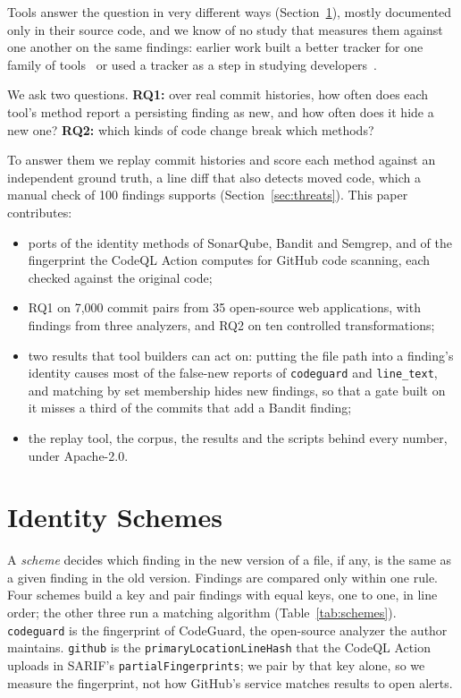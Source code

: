 \documentclass[conference]{IEEEtran}
\newif\ifanon
\begin{document}
Tools answer the question in very different ways (Section~\ref{sec:schemes}), mostly
documented only in their source code, and we know of no study that measures them against one
another on the same findings: earlier work built a better tracker for one family of
tools~\cite{li2022statictracker} or used a tracker as a step in studying
developers~\cite{avgustinov2015,kim2007}.

We ask two questions. \textbf{RQ1:} over real commit histories, how often does each
tool's method report a persisting finding as new, and how often does it hide a new one?
\textbf{RQ2:} which kinds of code change break which methods?

To answer them we replay commit histories and score each method against an independent
ground truth, a line diff that also detects moved code, which a manual check of 100
findings supports (Section~\ref{sec:threats}). This paper contributes:
\begin{itemize}
\item ports of the identity methods of SonarQube, Bandit and Semgrep, and of the
  fingerprint the CodeQL Action computes for GitHub code scanning, each checked against
  the original code;
\item RQ1 on 7,000 commit pairs from 35 open-source web applications, with findings from
  three analyzers, and RQ2 on ten controlled transformations;
\item two results that tool builders can act on: putting the file path into a
  finding's identity causes most of the false-new reports of \texttt{codeguard} and
  \texttt{line\_text}, and matching by set membership hides new findings, so that a
  gate built on it misses a third of the commits that add a Bandit finding;
\item the replay tool, the corpus, the results and the scripts behind every number,
  under Apache-2.0.
\end{itemize}

\section{Identity Schemes}\label{sec:schemes}

A \emph{scheme} decides which finding in the new version of a file, if any, is the same
as a given finding in the old version. Findings are compared only within one rule. Four
schemes build a key and pair findings with equal keys, one to one, in line order; the
other three run a matching algorithm (Table~\ref{tab:schemes}). \texttt{codeguard} is the
fingerprint of CodeGuard, \ifanon the authors' own open-source analyzer\else the
open-source analyzer the author maintains\fi. \texttt{github} is the
\texttt{primaryLocationLineHash} that the CodeQL Action uploads in SARIF's
\texttt{partialFingerprints}; we pair by that key alone, so we measure the fingerprint,
not how GitHub's service matches results to open alerts.
\end{document}
